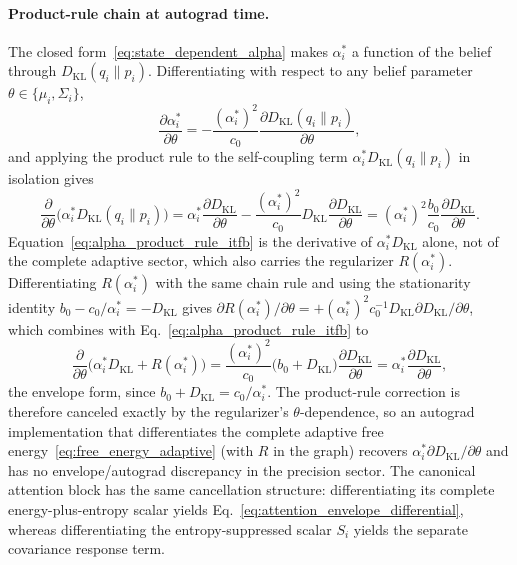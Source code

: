 \documentclass[11pt]{article}
\begin{document}
\paragraph{Product-rule chain at autograd time.}
The closed form~\eqref{eq:state_dependent_alpha} makes $\alpha_i^*$ a function of the belief through $D_{\mathrm{KL}}(q_i \| p_i)$. Differentiating with respect to any belief parameter $\theta \in \{\mu_i, \Sigma_i\}$,
\begin{equation}
\frac{\partial \alpha_i^*}{\partial \theta} = -\frac{(\alpha_i^*)^2}{c_0} \frac{\partial D_{\mathrm{KL}}(q_i \| p_i)}{\partial \theta},
\label{eq:alpha_chain_rule_itfb}
\end{equation}
and applying the product rule to the self-coupling term $\alpha_i^* D_{\mathrm{KL}}(q_i \| p_i)$ in isolation gives
\begin{equation}
\frac{\partial}{\partial \theta}\bigl(\alpha_i^* D_{\mathrm{KL}}(q_i \| p_i)\bigr) = \alpha_i^* \frac{\partial D_{\mathrm{KL}}}{\partial \theta} - \frac{(\alpha_i^*)^2}{c_0} D_{\mathrm{KL}} \frac{\partial D_{\mathrm{KL}}}{\partial \theta} = (\alpha_i^*)^2 \frac{b_0}{c_0} \frac{\partial D_{\mathrm{KL}}}{\partial \theta}.
\label{eq:alpha_product_rule_itfb}
\end{equation}
Equation~\eqref{eq:alpha_product_rule_itfb} is the derivative of $\alpha_i^* D_{\mathrm{KL}}$ alone, not of the complete adaptive sector, which also carries the regularizer $R(\alpha_i^*)$. Differentiating $R(\alpha_i^*)$ with the same chain rule and using the stationarity identity $b_0 - c_0/\alpha_i^* = -D_{\mathrm{KL}}$ gives $\partial R(\alpha_i^*)/\partial\theta = +(\alpha_i^*)^2 c_0^{-1} D_{\mathrm{KL}}  \partial D_{\mathrm{KL}}/\partial\theta$, which combines with Eq.~\eqref{eq:alpha_product_rule_itfb} to
\begin{equation}
\frac{\partial}{\partial\theta}\bigl(\alpha_i^* D_{\mathrm{KL}} + R(\alpha_i^*)\bigr) = \frac{(\alpha_i^*)^2}{c_0}\bigl(b_0 + D_{\mathrm{KL}}\bigr)\frac{\partial D_{\mathrm{KL}}}{\partial\theta} = \alpha_i^*\frac{\partial D_{\mathrm{KL}}}{\partial\theta},
\label{eq:alpha_envelope_cancel_itfb}
\end{equation}
the envelope form, since $b_0 + D_{\mathrm{KL}} = c_0/\alpha_i^*$. The product-rule correction is therefore canceled exactly by the regularizer's $\theta$-dependence, so an autograd implementation that differentiates the complete adaptive free energy~\eqref{eq:free_energy_adaptive} (with $R$ in the graph) recovers $\alpha_i^* \partial D_{\mathrm{KL}}/\partial\theta$ and has no envelope/autograd discrepancy in the precision sector. The canonical attention block has the same cancellation structure: differentiating its complete energy-plus-entropy scalar yields Eq.~\eqref{eq:attention_envelope_differential}, whereas differentiating the entropy-suppressed scalar $S_i$ yields the separate covariance response term.
\end{document}
